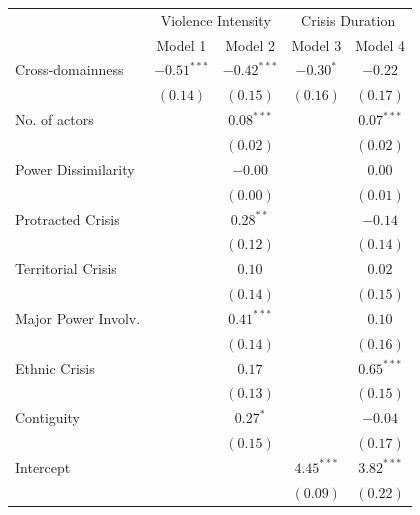 \documentclass[
]{article}
\begin{document}
\begin{table}[h!]
\begin{center}
\begin{tabular}{l c c c c}
\hline
 & \multicolumn{2}{c}{Violence Intensity} & \multicolumn{2}{c}{Crisis Duration} \\
\cline{2-3} \cline{4-5}
 & Model 1 & Model 2 & Model 3 & Model 4 \\
\hline
Cross-domainness    & $-0.51^{***}$ & $-0.42^{***}$ & $-0.30^{*}$  & $-0.22$      \\
                    & $(0.14)$      & $(0.15)$      & $(0.16)$     & $(0.17)$     \\
No. of actors       &               & $0.08^{***}$  &              & $0.07^{***}$ \\
                    &               & $(0.02)$      &              & $(0.02)$     \\
Power Dissimilarity &               & $-0.00$       &              & $0.00$       \\
                    &               & $(0.00)$      &              & $(0.01)$     \\
Protracted Crisis   &               & $0.28^{**}$   &              & $-0.14$      \\
                    &               & $(0.12)$      &              & $(0.14)$     \\
Territorial Crisis  &               & $0.10$        &              & $0.02$       \\
                    &               & $(0.14)$      &              & $(0.15)$     \\
Major Power Involv. &               & $0.41^{***}$  &              & $0.10$       \\
                    &               & $(0.14)$      &              & $(0.16)$     \\
Ethnic Crisis       &               & $0.17$        &              & $0.65^{***}$ \\
                    &               & $(0.13)$      &              & $(0.15)$     \\
Contiguity          &               & $0.27^{*}$    &              & $-0.04$      \\
                    &               & $(0.15)$      &              & $(0.17)$     \\
Intercept           &               &               & $4.45^{***}$ & $3.82^{***}$ \\
                    &               &               & $(0.09)$     & $(0.22)$     \\

\end{tabular}
\end{center}
\end{table}
\end{document}
